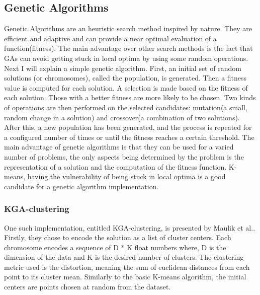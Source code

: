 \documentclass[12pt]{article}
\begin{document}
	\subsection{Genetic Algorithms}
	Genetic Algorithms\cite{ProgrammingCollectiveIntelligence} are an heuristic search method inspired by nature. They are efficient and adaptive and can provide a near optimal evaluation of a function(fitness). The main advantage over other search methods is the fact that GAs can avoid getting stuck in local optima by using some random operations. Next I will explain a simple genetic algorithm. First, an initial set of random solutions (or chromosomes), called the population, is generated. Then a fitness value is computed for each solution. A selection is made based on the fitness of each solution. Those with a better fitness are more likely to be chosen. Two kinds of operations are then performed on the selected candidates: mutation(a small, random change in a solution) and crossover(a combination of two solutions). After this, a new population has been generated, and the process is repeated for a configured number of times or until the fitness reaches a certain threshold. The main advantage of genetic algorithms is that they can be used for a varied number of problems, the only aspects being determined by the problem is the representation of a solution and the computation of the fitness function. K-means, having the vulnerability of being stuck in local optima is a good candidate for a genetic algorithm implementation.
	
	\subsubsection{KGA-clustering}
	One such implementation, entitled KGA-clustering, is presented by Maulik et al.\cite{EvolutionaryKMeans}. Firstly, they chose to encode the solution as a list of cluster centers. Each chromosome encodes a sequence of D * K float numbers where, D is the dimension of the data and K is the desired number of clusters. The clustering metric used is the distortion, meaning the sum of euclidean distances from each point to its cluster mean. Similarly to the basic K-means algorithm, the initial centers are points chosen at random from the dataset.
	
\end{document}
